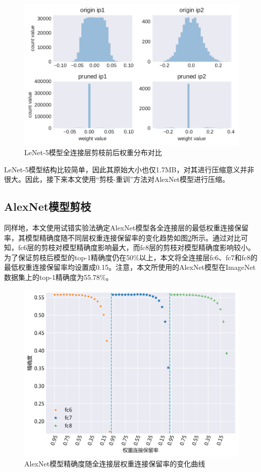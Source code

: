 \begin{figure}[htbp]
    \centering
    \includegraphics[height=0.45\textwidth]{figures/lenet_pruned_weights.pdf}
    \caption{LeNet-5模型全连接层剪枝前后权重分布对比}\label{figure:figure22}
\end{figure}

LeNet-5模型结构比较简单，因此其原始大小也仅1.7MB，对其进行压缩意义并非很大。因此，接下来本文使用“剪枝-重训”方法对AlexNet模型进行压缩。


\subsection{AlexNet模型剪枝}

同样地，本文使用试错实验法确定AlexNet模型各全连接层的最低权重连接保留率，其模型精确度随不同层权重连接保留率的变化趋势如图\ref{figure:figure23}所示。通过对比可知，fc6层的剪枝对模型精确度影响最大，而fc8层的剪枝对模型精确度影响较小。为了保证剪枝后模型的top-1精确度仍在50\%以上，本文将全连接层fc6、fc7和fc8的最低权重连接保留率均设置成0.15。注意，本文所使用的AlexNet模型在ImageNet\cite{imagenet.org}数据集上的top-1精确度为55.78\%。

\begin{figure}[htbp]
    \centering
    \includegraphics[height=0.42\textwidth]{figures/alexnet_pruned_threshold.pdf}
    \caption{AlexNet模型精确度随全连接层权重连接保留率的变化曲线}\label{figure:figure23}
\end{figure}

